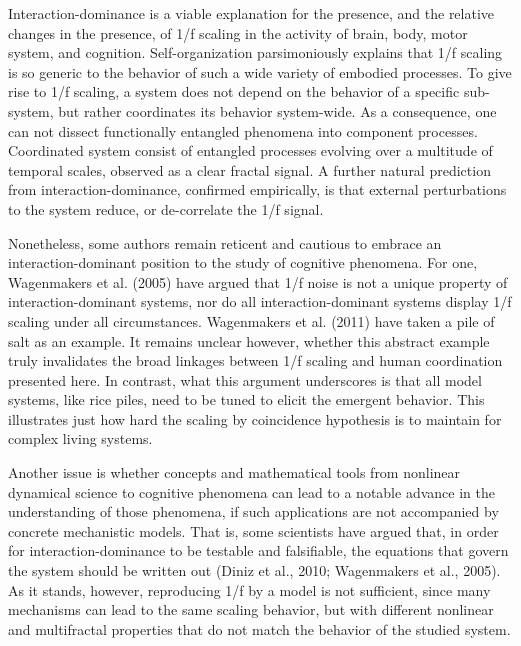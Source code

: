 \documentclass[12pt,]{book}
\begin{document}
Interaction-dominance is a viable explanation for the presence, and the relative changes in the presence, of 1/f scaling in the activity of brain, body, motor system, and cognition. Self-organization parsimoniously explains that 1/f scaling is so generic to the behavior of such a wide variety of embodied processes. To give rise to 1/f scaling, a system does not depend on the behavior of a specific sub-system, but rather coordinates its behavior system-wide. As a consequence, one can not dissect functionally entangled phenomena into component processes. Coordinated system consist of entangled processes evolving over a multitude of temporal scales, observed as a clear fractal signal. A further natural prediction from interaction-dominance, confirmed empirically, is that external perturbations to the system reduce, or de-correlate the 1/f signal.

Nonetheless, some authors remain reticent and cautious to embrace an interaction-dominant position to the study of cognitive phenomena. For one, Wagenmakers et al. (2005) have argued that 1/f noise is not a unique property of interaction-dominant systems, nor do all interaction-dominant systems display 1/f scaling under all circumstances. Wagenmakers et al. (2011) have taken a pile of salt as an example. It remains unclear however, whether this abstract example truly invalidates the broad linkages between 1/f scaling and human coordination presented here. In contrast, what this argument underscores is that all model systems, like rice piles, need to be tuned to elicit the emergent behavior. This illustrates just how hard the scaling by coincidence hypothesis is to maintain for complex living systems.

Another issue is whether concepts and mathematical tools from nonlinear dynamical science to cognitive phenomena can lead to a notable advance in the understanding of those phenomena, if such applications are not accompanied by concrete mechanistic models. That is, some scientists have argued that, in order for interaction-dominance to be testable and falsifiable, the equations that govern the system should be written out (Diniz et al., 2010; Wagenmakers et al., 2005). As it stands, however, reproducing 1/f by a model is not sufficient, since many mechanisms can lead to the same scaling behavior, but with different nonlinear and multifractal properties that do not match the behavior of the studied system.
\end{document}
